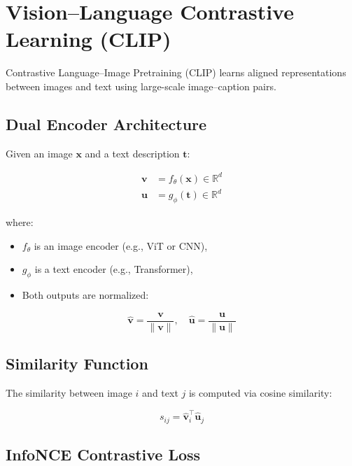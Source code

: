 \section{Vision–Language Contrastive Learning (CLIP)}
\label{sec:clip_theory}

Contrastive Language–Image Pretraining (CLIP) learns aligned representations between images and text using large-scale image–caption pairs.

\subsection{Dual Encoder Architecture}

Given an image $\mathbf{x}$ and a text description $\mathbf{t}$:

\begin{align}
\mathbf{v} &= f_\theta(\mathbf{x}) \in \mathbb{R}^d \\
\mathbf{u} &= g_\phi(\mathbf{t}) \in \mathbb{R}^d
\end{align}

where:
\begin{itemize}
    \item $f_\theta$ is an image encoder (e.g., ViT or CNN),
    \item $g_\phi$ is a text encoder (e.g., Transformer),
    \item Both outputs are normalized:
\end{itemize}

\begin{equation}
\hat{\mathbf{v}} = \frac{\mathbf{v}}{\|\mathbf{v}\|}, \quad
\hat{\mathbf{u}} = \frac{\mathbf{u}}{\|\mathbf{u}\|}
\end{equation}

\subsection{Similarity Function}

The similarity between image $i$ and text $j$ is computed via cosine similarity:

\begin{equation}
s_{ij} = \hat{\mathbf{v}}_i^\top \hat{\mathbf{u}}_j
\end{equation}

\subsection{InfoNCE Contrastive Loss}


